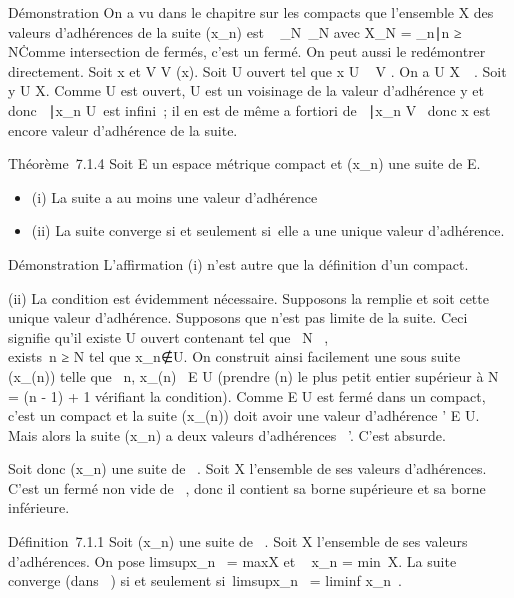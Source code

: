 \documentclass[]{article}
\begin{document}
Démonstration On a vu dans le chapitre sur les compacts que l'ensemble X
des valeurs d'adhérences de la suite (x\_n) est
\⋂ ~
\_N\in{}~\overlineX\_N avec X\_N =
\x\_n∣n ≥
N\. Comme intersection de fermés, c'est un fermé. On
peut aussi le redémontrer directement. Soit x
\in\overlineX et V \in V (x). Soit U ouvert tel que x \in U
\subset~ V . On a U \bigcap X\neq~\varnothing~. Soit y \in U \bigcap X. Comme U
est ouvert, U est un voisinage de la valeur d'adhérence y et donc
\n \in {}~∣x\_n \in
U\ est infini~; il en est de même a fortiori de
\n \in {}~∣x\_n \in V
\, donc x est encore valeur d'adhérence de la suite.

Théorème~7.1.4 Soit E un espace métrique compact et (x\_n) une
suite de E.

\begin{itemize}
\itemsep1pt\parskip0pt
\item
  (i) La suite a au moins une valeur d'adhérence
\item
  (ii) La suite converge si et seulement si~elle a une unique valeur
  d'adhérence.
\end{itemize}

Démonstration L'affirmation (i) n'est autre que la définition d'un
compact.

(ii) La condition est évidemment nécessaire. Supposons la remplie et
soit \ell cette unique valeur d'adhérence. Supposons que \ell n'est pas limite
de la suite. Ceci signifie qu'il existe U ouvert contenant \ell tel que
\forall~N \in {}~, \\exists~n ≥ N tel
que x\_n∉U. On construit ainsi
facilement une sous suite (x\_\phi(n)) telle que
\forall~n, x\_\phi(n)~ \in E \diagdown U (prendre \phi(n) le
plus petit entier supérieur à N = \phi(n - 1) + 1 vérifiant la condition).
Comme E \diagdown U est fermé dans un compact, c'est un compact et la suite
(x\_\phi(n)) doit avoir une valeur d'adhérence \ell' \in E \diagdown U. Mais
alors la suite (x\_n) a deux valeurs d'adhérences
\ell\neq~\ell'. C'est absurde.

Soit donc (x\_n) une suite de \overline{}~.
Soit X l'ensemble de ses valeurs d'adhérences. C'est un fermé non vide
de \overline{}~, donc il contient sa borne supérieure
et sa borne inférieure.

Définition~7.1.1 Soit (x\_n) une suite de
\overline{}~. Soit X l'ensemble de ses valeurs
d'adhérences. On pose limsupx\_n~
= maxX et \liminf~
x\_n = min~X. La suite converge (dans
\overline{}~) si et seulement
si~limsupx\_n~
= liminf x\_n~.
\end{document}
